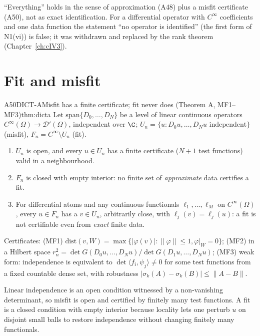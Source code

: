 \begin{caution}[title=What the theorem does not say]
``Everything'' holds in the sense of approximation (A48) plus a misfit certificate (A50), not as exact identification. For a differential operator with $C^\infty$ coefficients and one data function the statement ``no operator is identified'' (the first form of N1(vi)) is false; it was withdrawn and replaced by the rank theorem (Chapter~\ref{ch:cIV3}).
\end{caution}

\section{Fit and misfit}

\begin{dimcard}{A50}{DICT-A}{Misfit has a finite certificate; fit never does (Theorem A, MF1--MF3)}{\proved}{thm:dicta}
Let $\mathrm{span}\{D_0,\dots,D_N\}$ be a level of linear continuous operators $C^\infty(\Omega)\to\mathcal D'(\Omega)$, independent over $\C$; $U_n=\{u:D_0u,\dots,D_Nu\text{ independent}\}$ (misfit), $F_n=C^\infty\setminus U_n$ (fit).
\begin{enumerate}[label=(\roman*)]
\item $U_n$ is open, and every $u\in U_n$ has a finite certificate ($N+1$ test functions) valid in a neighbourhood.
\item $F_n$ is closed with empty interior: no finite set of \emph{approximate} data certifies a fit.
\item For differential atoms and any continuous functionals $\ell_1,\dots,\ell_M$ on $C^\infty(\Omega)$, every $u\in F_n$ has a $v\in U_n$, arbitrarily close, with $\ell_j(v)=\ell_j(u)$: a fit is not certifiable even from \emph{exact} finite data.
\end{enumerate}
Certificates: (MF1) $\mathrm{dist}(v,W)=\max\{|\varphi(v)|:\|\varphi\|\le1,\varphi|_W=0\}$; (MF2) in a Hilbert space $r_n^2=\det G(D_0u,\dots,D_Nu)/\det G(D_1u,\dots,D_Nu)$; (MF3) weak form: independence is equivalent to $\det\langle f_i,\psi_j\rangle\ne0$ for some test functions from a fixed countable dense set, with robustness $|\sigma_k(A)-\sigma_k(B)|\le\|A-B\|$.
\end{dimcard}

\begin{proofidea}
Linear independence is an open condition witnessed by a non-vanishing determinant, so misfit is open and certified by finitely many test functions. A fit is a closed condition with empty interior because locality lets one perturb $u$ on disjoint small balls to restore independence without changing finitely many functionals.
\end{proofidea}

